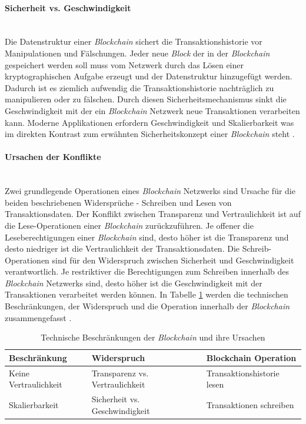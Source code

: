 \paragraph{Sicherheit vs. Geschwindigkeit}$~~$\\
Die Datenstruktur einer \textit{Blockchain} sichert die Transaktionshistorie vor Manipulationen und Fälschungen. Jeder neue \textit{Block} der in der \textit{Blockchain} gespeichert werden soll muss vom Netzwerk durch das Lösen einer kryptographischen Aufgabe erzeugt und der Datenstruktur hinzugefügt werden. Dadurch ist es ziemlich aufwendig die Transaktionshistorie nachträglich zu manipulieren oder zu fälschen. Durch diesen Sicherheitsmechanismus sinkt die Geschwindigkeit mit der ein \textit{Blockchain} Netzwerk neue Transaktionen verarbeiten kann. Moderne Applikationen erfordern Geschwindigkeit und Skalierbarkeit was im direkten Kontrast zum erwähnten Sicherheitskonzept einer \textit{Blockchain} steht \citep{Drescher2017}.

\paragraph{Ursachen der Konflikte}$~~$\\
Zwei grundlegende Operationen eines \textit{Blockchain} Netzwerks sind Ursache für die beiden beschriebenen Widersprüche - Schreiben und Lesen von Transaktionsdaten. Der Konflikt zwischen Transparenz und Vertraulichkeit ist auf die Lese-Operationen einer \textit{Blockchain} zurückzuführen. Je offener die Leseberechtigungen einer \textit{Blockchain} sind, desto höher ist die Transparenz und desto niedriger ist die Vertraulichkeit der Transaktionsdaten. Die Schreib-Operationen sind für den Widerspruch zwischen Sicherheit und Geschwindigkeit verantwortlich. Je restriktiver die Berechtigungen zum Schreiben innerhalb des \textit{Blockchain} Netzwerks sind, desto höher ist die Geschwindigkeit mit der Transaktionen verarbeitet werden können. In Tabelle \ref{tab:technical-restricts-blockchain} werden die technischen Beschränkungen, der Widerspruch und die Operation innerhalb der \textit{Blockchain} zusammengefasst \citep{Drescher2017}.

\begin{table}[H]
	\begin{tabular}{@{}lll@{}}
		\toprule
		\textbf{Beschränkung} & \textbf{Widerspruch}            & \textbf{Blockchain Operation} \\
		\midrule
		Keine Vertraulichkeit & Transparenz vs. Vertraulichkeit & Transaktionshistorie lesen    \\ \addlinespace
		Skalierbarkeit        & Sicherheit vs. Geschwindigkeit  & Transaktionen schreiben       \\
		\bottomrule
	\end{tabular}
	\caption{Technische Beschränkungen der \textit{Blockchain} und ihre Ursachen}
    \label{tab:technical-restricts-blockchain}
\end{table}

